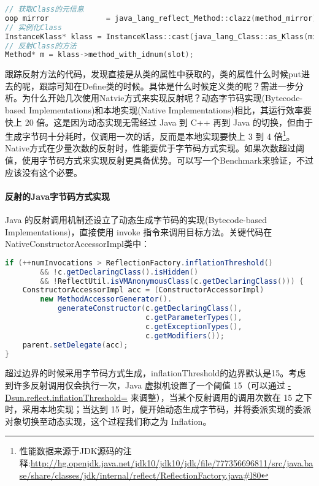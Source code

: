 \documentclass[../../../interview-questions.tex]{subfiles}
\begin{document}
\begin{lstlisting}[language=C++]
// 获取Class的元信息
oop mirror             = java_lang_reflect_Method::clazz(method_mirror);
// 实例化Class
InstanceKlass* klass = InstanceKlass::cast(java_lang_Class::as_Klass(mirror));
// 反射Class的方法
Method* m = klass->method_with_idnum(slot);
\end{lstlisting}

跟踪反射方法的代码，发现直接是从类的属性中获取的，类的属性什么时候put进去的呢，跟踪可知在Define类的时候。具体是什么时候定义类的呢？需进一步分析。为什么开始几次使用Natvie方式来实现反射呢？动态字节码实现(Bytecode-based Implementations)和本地实现(Native Implementations)相比，其运行效率要快上 20 倍。这是因为动态实现无需经过 Java 到 C++ 再到 Java 的切换，但由于生成字节码十分耗时，仅调用一次的话，反而是本地实现要快上 3 到 4 倍\footnote{性能数据来源于JDK源码的注释:\url{http://hg.openjdk.java.net/jdk10/jdk10/jdk/file/777356696811/src/java.base/share/classes/jdk/internal/reflect/ReflectionFactory.java\#l80}}。Native方式在少量次数的反射时，性能要优于字节码方式实现。如果次数超过阈值，使用字节码方式来实现反射更具备优势。可以写一个Benchmark来验证，不过应该没有这个必要。

\paragraph{反射的Java字节码方式实现}

Java 的反射调用机制还设立了动态生成字节码的实现(Bytecode-based Implementations)，直接使用 invoke 指令来调用目标方法。关键代码在NativeConstructorAccessorImpl类中：

\begin{lstlisting}[language=Java]
if (++numInvocations > ReflectionFactory.inflationThreshold()
        && !c.getDeclaringClass().isHidden()
        && !ReflectUtil.isVMAnonymousClass(c.getDeclaringClass())) {
    ConstructorAccessorImpl acc = (ConstructorAccessorImpl)
        new MethodAccessorGenerator().
            generateConstructor(c.getDeclaringClass(),
                                c.getParameterTypes(),
                                c.getExceptionTypes(),
                                c.getModifiers());
    parent.setDelegate(acc);
}
\end{lstlisting}

超过边界的时候采用字节码方式生成，inflationThreshold的边界默认是15。考虑到许多反射调用仅会执行一次，Java 虚拟机设置了一个阈值 15（可以通过 \url{-Dsun.reflect.inflationThreshold=} 来调整），当某个反射调用的调用次数在 15 之下时，采用本地实现；当达到 15 时，便开始动态生成字节码，并将委派实现的委派对象切换至动态实现，这个过程我们称之为 Inflation。
\end{document}

